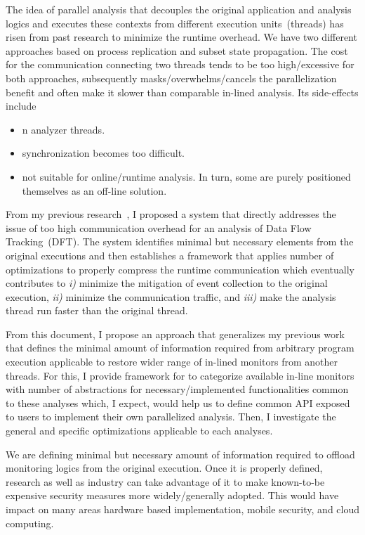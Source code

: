 The idea of parallel analysis that decouples the original application and
analysis logics and executes these contexts from different execution
units~(threads) has risen from past research to minimize the runtime overhead.  
%
We have two different approaches based on process replication and subset state
propagation.
%
The cost for the communication connecting two threads tends to be too
high/excessive for both approaches, subsequently masks/overwhelms/cancels the
parallelization benefit and often make it slower than comparable in-lined
analysis. Its side-effects include

\begin{itemize} \item n analyzer threads.  \item synchronization becomes too
difficult.  \item not suitable for online/runtime analysis. In turn, some are
purely positioned themselves as an off-line solution.  \end{itemize}

From my previous research~\cite{ShadowReplica, TFA}, I proposed a system that
directly addresses the issue of too high communication overhead for an analysis
of Data Flow Tracking~(DFT). The system identifies minimal but necessary
elements from the original executions and then establishes a framework that
applies number of optimizations to properly compress the runtime communication
which eventually contributes to {\it i)} minimize the mitigation of event
collection to the original execution, {\it ii)} minimize the communication
traffic, and {\it iii)} make the analysis thread run faster than the original
thread.


From this document, I propose an approach that generalizes my previous work
that defines the minimal amount of information required from arbitrary program
execution applicable to restore wider range of in-lined monitors from another
threads.
%
For this, I provide framework for to categorize available in-line
monitors~\cite{CAB} with number of abstractions for necessary/implemented
functionalities common to these analyses which, I expect, would help us to
define common API exposed to users to implement their own parallelized
analysis.
%
Then, I investigate the general and specific optimizations applicable to each
analyses.

We are defining minimal but necessary amount of information required to offload
monitoring logics from the original execution. Once it is properly defined,
research as well as industry can take advantage of it to make known-to-be
expensive security measures more widely/generally adopted.
%
This would have impact on many areas hardware based implementation, mobile
security, and cloud computing.


